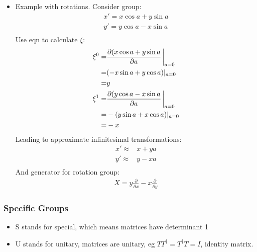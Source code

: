 \begin{itemize}
    \item Example with rotations. Consider group: \cite{ibragimov}
    \begin{equation}\begin{split}
    x'=x\cos{a}+y\sin{a} \\
    y'=y\cos{a}-x\sin{a} \\
    \end{split}\end{equation}
    Use eqn to calculate $\xi$:
    \begin{equation}\begin{split}
        \xi^0=&\frac{\partial(x\cos{a}+y\sin{a}}{\partial a}\eval_{a=0} \\
        =&(-x\sin{a}+y\cos{a})\vert_{a=0} \\
        =&y\\
        \xi^1=&\frac{\partial(y\cos{a}-x\sin{a}}{\partial a}\eval_{a=0} \\
        =&-(y\sin{a}+x\cos{a})\vert_{a=0} \\
        =&-x\\
    \end{split}\end{equation}
    Leading to approximate infinitesimal transformations:
    \begin{equation}\begin{split}
    x'\approx&x+ya \\
    y'\approx&y-xa \\
    \end{split}\end{equation}
    And generator for rotation group:
    \begin{equation}\begin{split}
        X=y\frac{\partial}{\partial x}-x\frac{\partial}{\partial y}
    \end{split}\end{equation}
\end{itemize}

\subsubsection{Specific Groups}
\begin{itemize}
        \item S stands for special, which means matrices have determinant 1 \cite{wells}
        \item U stands for unitary, matrices are unitary, eg $TT^\dagger=T^\dagger T=I$, identity matrix. \cite{wells}
\end{itemize}

